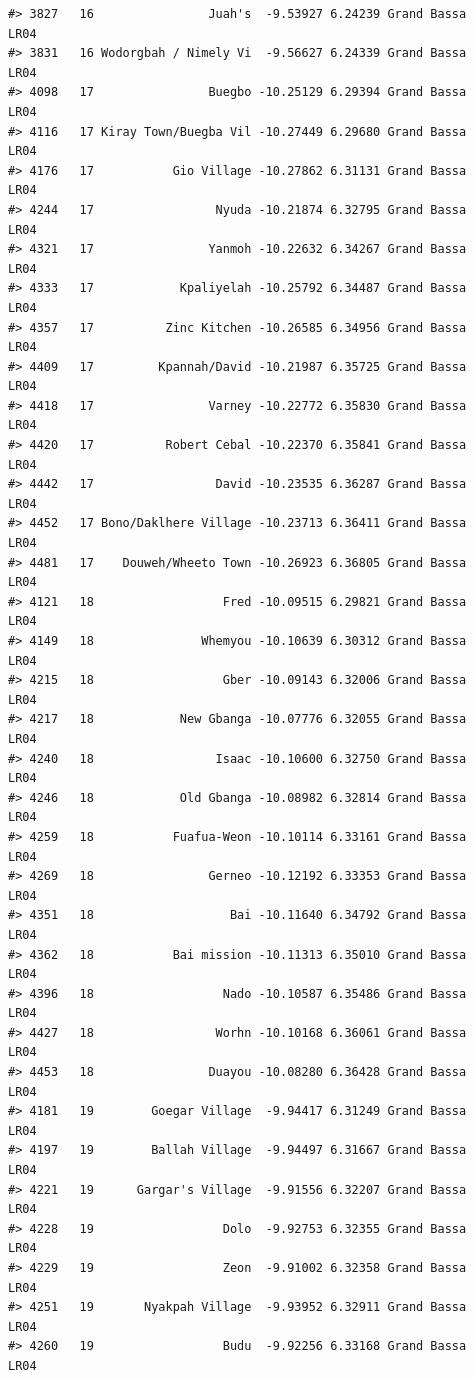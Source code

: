 \documentclass[12pt,a4paper]{book}
\theoremstyle{definition}
\theoremstyle{definition}
\theoremstyle{definition}
\theoremstyle{remark}
\begin{document}
\begin{verbatim}
#> 3827   16                Juah's  -9.53927 6.24239 Grand Bassa       LR04
#> 3831   16 Wodorgbah / Nimely Vi  -9.56627 6.24339 Grand Bassa       LR04
#> 4098   17                Buegbo -10.25129 6.29394 Grand Bassa       LR04
#> 4116   17 Kiray Town/Buegba Vil -10.27449 6.29680 Grand Bassa       LR04
#> 4176   17           Gio Village -10.27862 6.31131 Grand Bassa       LR04
#> 4244   17                 Nyuda -10.21874 6.32795 Grand Bassa       LR04
#> 4321   17                Yanmoh -10.22632 6.34267 Grand Bassa       LR04
#> 4333   17            Kpaliyelah -10.25792 6.34487 Grand Bassa       LR04
#> 4357   17          Zinc Kitchen -10.26585 6.34956 Grand Bassa       LR04
#> 4409   17         Kpannah/David -10.21987 6.35725 Grand Bassa       LR04
#> 4418   17                Varney -10.22772 6.35830 Grand Bassa       LR04
#> 4420   17          Robert Cebal -10.22370 6.35841 Grand Bassa       LR04
#> 4442   17                 David -10.23535 6.36287 Grand Bassa       LR04
#> 4452   17 Bono/Daklhere Village -10.23713 6.36411 Grand Bassa       LR04
#> 4481   17    Douweh/Wheeto Town -10.26923 6.36805 Grand Bassa       LR04
#> 4121   18                  Fred -10.09515 6.29821 Grand Bassa       LR04
#> 4149   18               Whemyou -10.10639 6.30312 Grand Bassa       LR04
#> 4215   18                  Gber -10.09143 6.32006 Grand Bassa       LR04
#> 4217   18            New Gbanga -10.07776 6.32055 Grand Bassa       LR04
#> 4240   18                 Isaac -10.10600 6.32750 Grand Bassa       LR04
#> 4246   18            Old Gbanga -10.08982 6.32814 Grand Bassa       LR04
#> 4259   18           Fuafua-Weon -10.10114 6.33161 Grand Bassa       LR04
#> 4269   18                Gerneo -10.12192 6.33353 Grand Bassa       LR04
#> 4351   18                   Bai -10.11640 6.34792 Grand Bassa       LR04
#> 4362   18           Bai mission -10.11313 6.35010 Grand Bassa       LR04
#> 4396   18                  Nado -10.10587 6.35486 Grand Bassa       LR04
#> 4427   18                 Worhn -10.10168 6.36061 Grand Bassa       LR04
#> 4453   18                Duayou -10.08280 6.36428 Grand Bassa       LR04
#> 4181   19        Goegar Village  -9.94417 6.31249 Grand Bassa       LR04
#> 4197   19        Ballah Village  -9.94497 6.31667 Grand Bassa       LR04
#> 4221   19      Gargar's Village  -9.91556 6.32207 Grand Bassa       LR04
#> 4228   19                  Dolo  -9.92753 6.32355 Grand Bassa       LR04
#> 4229   19                  Zeon  -9.91002 6.32358 Grand Bassa       LR04
#> 4251   19       Nyakpah Village  -9.93952 6.32911 Grand Bassa       LR04
#> 4260   19                  Budu  -9.92256 6.33168 Grand Bassa       LR04

\end{verbatim}
\end{document}
